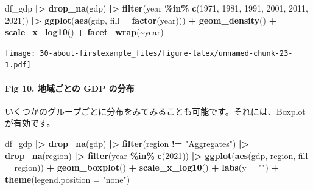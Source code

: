 \documentclass[
  xelatex, ja=standard]{bxjsbook}
\newenvironment{Shaded}{\begin{snugshade}}{\end{snugshade}}
\newcommand{\AttributeTok}[1]{\textcolor[rgb]{0.13,0.29,0.53}{#1}}
\newcommand{\DecValTok}[1]{\textcolor[rgb]{0.00,0.00,0.81}{#1}}
\newcommand{\FunctionTok}[1]{\textcolor[rgb]{0.13,0.29,0.53}{\textbf{#1}}}
\newcommand{\NormalTok}[1]{#1}
\newcommand{\SpecialCharTok}[1]{\textcolor[rgb]{0.81,0.36,0.00}{\textbf{#1}}}
\newcommand{\StringTok}[1]{\textcolor[rgb]{0.31,0.60,0.02}{#1}}
\theoremstyle{definition}
\theoremstyle{definition}
\theoremstyle{definition}
\theoremstyle{definition}
\theoremstyle{remark}
\begin{document}
\begin{Shaded}
\begin{Highlighting}[]
\NormalTok{df\_gdp }\SpecialCharTok{|\textgreater{}} \FunctionTok{drop\_na}\NormalTok{(gdp) }\SpecialCharTok{|\textgreater{}} 
  \FunctionTok{filter}\NormalTok{(year }\SpecialCharTok{\%in\%} \FunctionTok{c}\NormalTok{(}\DecValTok{1971}\NormalTok{, }\DecValTok{1981}\NormalTok{, }\DecValTok{1991}\NormalTok{, }\DecValTok{2001}\NormalTok{, }\DecValTok{2011}\NormalTok{, }\DecValTok{2021}\NormalTok{)) }\SpecialCharTok{|\textgreater{}}
  \FunctionTok{ggplot}\NormalTok{(}\FunctionTok{aes}\NormalTok{(gdp, }\AttributeTok{fill =} \FunctionTok{factor}\NormalTok{(year))) }\SpecialCharTok{+} 
  \FunctionTok{geom\_density}\NormalTok{() }\SpecialCharTok{+} \FunctionTok{scale\_x\_log10}\NormalTok{() }\SpecialCharTok{+} \FunctionTok{facet\_wrap}\NormalTok{(}\SpecialCharTok{\textasciitilde{}}\NormalTok{year)}
\end{Highlighting}
\end{Shaded}

\texttt{[image: 30-about-firstexample\_files/figure-latex/unnamed-chunk-23-1.pdf]}

\hypertarget{fig-10.-ux5730ux57dfux3054ux3068ux306e-gdp-ux306eux5206ux5e03-1}{%
\paragraph{Fig 10. 地域ごとの GDP の分布}\label{fig-10.-ux5730ux57dfux3054ux3068ux306e-gdp-ux306eux5206ux5e03-1}}

いくつかのグループごとに分布をみてみることも可能です。それには、Boxplot が有効です。

\begin{Shaded}
\begin{Highlighting}[]
\NormalTok{df\_gdp }\SpecialCharTok{|\textgreater{}} \FunctionTok{drop\_na}\NormalTok{(gdp) }\SpecialCharTok{|\textgreater{}} \FunctionTok{filter}\NormalTok{(region }\SpecialCharTok{!=} \StringTok{"Aggregates"}\NormalTok{) }\SpecialCharTok{|\textgreater{}}
  \FunctionTok{drop\_na}\NormalTok{(region) }\SpecialCharTok{|\textgreater{}} \FunctionTok{filter}\NormalTok{(year }\SpecialCharTok{\%in\%} \FunctionTok{c}\NormalTok{(}\DecValTok{2021}\NormalTok{)) }\SpecialCharTok{|\textgreater{}}
  \FunctionTok{ggplot}\NormalTok{(}\FunctionTok{aes}\NormalTok{(gdp, region, }\AttributeTok{fill =}\NormalTok{ region)) }\SpecialCharTok{+} 
  \FunctionTok{geom\_boxplot}\NormalTok{() }\SpecialCharTok{+} \FunctionTok{scale\_x\_log10}\NormalTok{() }\SpecialCharTok{+} \FunctionTok{labs}\NormalTok{(}\AttributeTok{y =} \StringTok{""}\NormalTok{) }\SpecialCharTok{+} 
  \FunctionTok{theme}\NormalTok{(}\AttributeTok{legend.position =} \StringTok{"none"}\NormalTok{)}
\end{Highlighting}
\end{Shaded}
\end{document}
